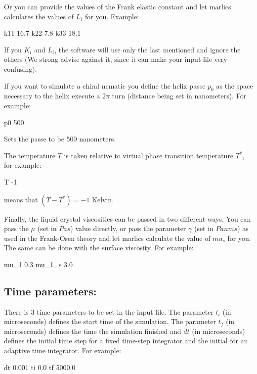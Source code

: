 \documentclass{article}
\begin{document}
Or you can provide the values of the Frank elastic constant and let marlics calculates the values of $L_i$ for you. Example:

k11 16.7
k22 7.8
k33 18.1

If you  $K_i$ and $L_i$, the software will use only the last mentioned and ignore the others (We strong advise against it, since it can make your input file very confusing).

{If you want to simulate a chiral nematic you define the helix passe $p_0$} as the space necessary to the helix execute a $2 \pi$  turn (distance being set in nanometers). For example:

p0 500.

Sets the passe to be 500 nanometers.


The temperature $T$  is taken relative to virtual phase transition temperature $T^*$, for example:

T -1

means that $(T-T^*)=-1$ Kelvin.


Finally, the liquid crystal viscosities can be passed in two different ways. You can pass the $\mu$ (set in $Pa s$) value directly, or pass the parameter $\gamma$ (set in $Pa nm s$) as used in the Frank-Osen theory and let marlics calculate the value of $mu_s$ for you. The same can be done with the surface viscosity. For example:

mu_1      0.3          %
mu_1_s    3.0          %


\subsection{Time parameters:}

There is 3 time parameters to be set in the input file.  The parameter $t_i$ (in microseconds) defines the start time of the simulation. The parameter $t_f$ (in microseconds) defines the time the simulation finished and $dt$ (in microseconds) defines the initial time step for a fixed time-step integrator and the initial for an adaptive time integrator. For example:

dt        0.001     %
ti        0.0       %
tf        5000.0    %
\end{document}
